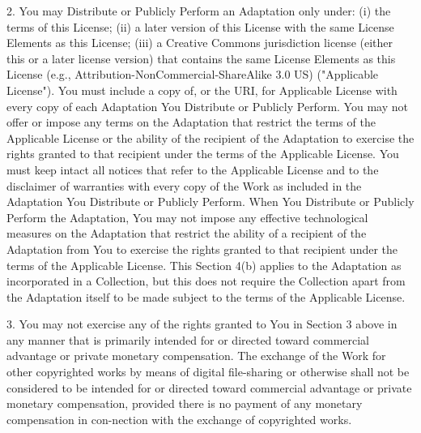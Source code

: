 2. You may Distribute or Publicly Perform an Adaptation only under:
(i) the terms of this License; (ii) a later version of this License
with the same License Elements as this License; (iii) a Creative
Commons jurisdiction license (either this or a later license
version) that contains the same License Elements as this License
(e.g., Attribution-NonCommercial-ShareAlike 3.0 US) ("Applicable
License"). You must include a copy of, or the URI, for Applicable
License with every copy of each Adaptation You Distribute or
Publicly Perform. You may not offer or impose any terms on the
Adaptation that restrict the terms of the Applicable License or the
ability of the recipient of the Adaptation to exercise the rights
granted to that recipient under the terms of the Applicable
License. You must keep intact all notices that refer to the
Applicable License and to the disclaimer of warranties with every
copy of the Work as included in the Adaptation You Distribute or
Publicly Perform. When You Distribute or Publicly Perform the
Adaptation, You may not impose any effective technological measures
on the Adaptation that restrict the ability of a recipient of the
Adaptation from You to exercise the rights granted to that
recipient under the terms of the Applicable License. This Section
4(b) applies to the Adaptation as incorporated in a Collection, but
this does not require the Collection apart from the Adaptation
itself to be made subject to the terms of the Applicable License.

3. You may not exercise any of the rights granted to You in Section
3 above in any manner that is primarily intended for or directed
toward commercial advantage or private monetary compensation. The
exchange of the Work for other copyrighted works by means of
digital file-sharing or otherwise shall not be considered to be
intended for or directed toward commercial advantage or private
monetary compensation, provided there is no payment of any monetary
compensation in con-nection with the exchange of copyrighted
works.


